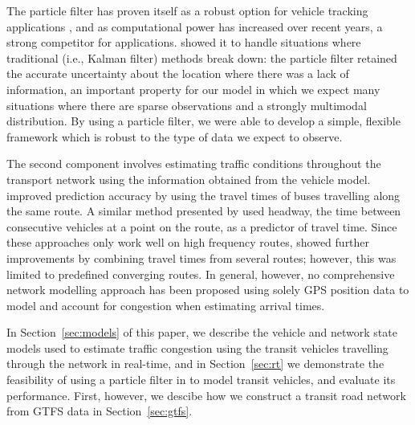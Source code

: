 The particle filter has proven itself as a robust option for
\rt vehicle tracking applications
\citep{Gustafsson_2002,Davidson_2011},
and as computational power has increased over recent years,
a strong competitor for \rt applications.
\cite{Ulmke_2006} showed it to handle situations where traditional
(i.e., Kalman filter) methods break down:
the particle filter retained the accurate uncertainty about the location
where there was a lack of information,
an important property for our model in which we expect
many situations where there are sparse observations
and a strongly multimodal distribution.
By using a particle filter,
we were able to develop a simple, flexible framework
which is robust to the type of data we expect to observe.


The second component involves estimating traffic conditions throughout the transport network
using the information obtained from the vehicle model.
\cite{Yu_2010} improved prediction accuracy by using the travel times
of buses travelling along the same route.
A similar method presented by \cite{Hans_2015}
used headway, the time between consecutive vehicles at a point on the route,
as a predictor of travel time.
Since these approaches only work well on high frequency routes,
\cite{Yu_2011} showed further improvements by combining travel times 
from several routes;
however, this was limited to predefined converging routes.
In general, however, no comprehensive network modelling approach has been proposed using
solely GPS position data to model and account for congestion when estimating arrival times.


In Section~\ref{sec:models} of this paper, 
we describe the \rt vehicle and network state models
used to estimate traffic congestion using the transit vehicles
travelling through the network in real-time,
and in Section~\ref{sec:rt} we demonstrate the feasibility of using a particle filter
in \rt to model transit vehicles,
and evaluate its performance.
First, however, we descibe how we construct a
transit road network from GTFS data in Section~\ref{sec:gtfs}.



